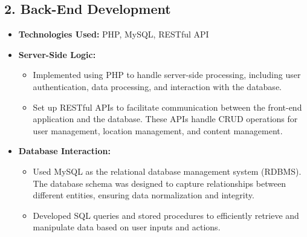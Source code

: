\subsection{2. Back-End Development}
\begin{itemize}
    \item \textbf{Technologies Used:} PHP, MySQL, RESTful API
    \item \textbf{Server-Side Logic:}
        \begin{itemize}
            \item Implemented using PHP to handle server-side processing, including user authentication, data processing, and interaction with the database.
            \item Set up RESTful APIs to facilitate communication between the front-end application and the database. These APIs handle CRUD operations for user management, location management, and content management.
        \end{itemize}
    \item \textbf{Database Interaction:}
        \begin{itemize}
            \item Used MySQL as the relational database management system (RDBMS). The database schema was designed to capture relationships between different entities, ensuring data normalization and integrity.
            \item Developed SQL queries and stored procedures to efficiently retrieve and manipulate data based on user inputs and actions.
        \end{itemize}
\end{itemize}

